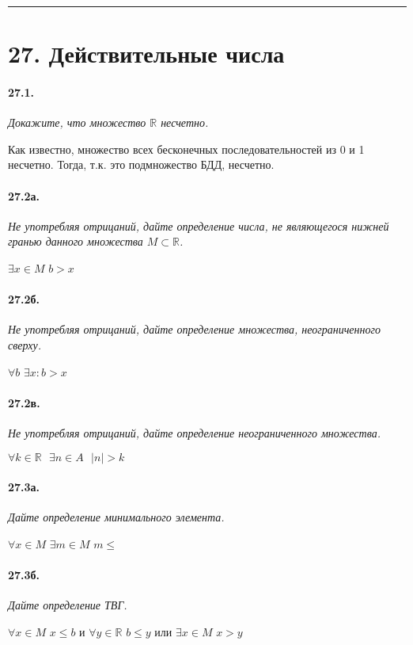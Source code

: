 \documentclass{book}
\begin{document}
\medskip\hrule\medskip
\section*{27. Действительные числа}

\paragraph{27.1.}
\textit{Докажите, что множество $\mathbb{R}$ несчетно.}

Как известно, множество всех бесконечных последовательностей из 0 и 1 несчетно. Тогда, т.к. это подмножество БДД, несчетно.

\paragraph{27.2а.}
\textit{Не употребляя отрицаний, дайте определение числа, не являющегося нижней гранью данного множества $M \subset \mathbb{R}$.}

$\exists x \in M$ $b > x$

\paragraph{27.2б.}
\textit{Не употребляя отрицаний, дайте определение множества, неограниченного сверху.}

$\forall b$ $\exists x: b > x$

\paragraph{27.2в.}
\textit{Не употребляя отрицаний, дайте определение неограниченного множества.}

$\forall k \in \mathbb{R} \text{ } \exists n \in A \text{ } |n| > k$

\paragraph{27.3а.}
\textit{Дайте определение минимального элемента.}

$\forall x \in M$ $\exists m \in M$ $m \le$

\paragraph{27.3б.}
\textit{Дайте определение ТВГ.}

$\forall x \in M$ $x \le b$ и $\forall y \in \mathbb{R}$ $b \le y$ или $\exists x \in M$ $x > y$
\end{document}
